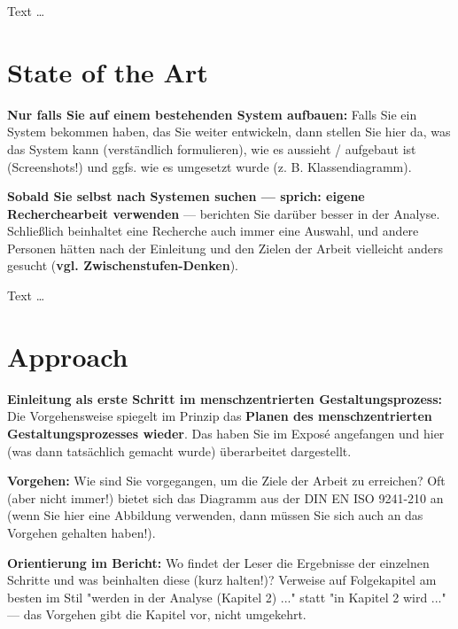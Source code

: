 \documentclass[11pt,a4paper,english]{scrreprt}
\newenvironment{comment}
  {\par\medskip
   \begingroup\color{olive}%
   }
 {\endgroup
  \medskip}
\begin{document}
Text \dots

\section{State of the Art}
\begin{comment}
\textbf{Nur falls Sie auf einem bestehenden System aufbauen:} Falls Sie ein System bekommen haben, das Sie weiter entwickeln, dann stellen Sie hier da, was das System kann (verständlich formulieren), wie es aussieht / aufgebaut ist (Screenshots!) und ggfs. wie es umgesetzt wurde (z. B. Klassendiagramm).

\textbf{Sobald Sie selbst nach Systemen suchen — sprich: eigene Recherchearbeit verwenden} — berichten Sie darüber besser in der Analyse. Schließlich beinhaltet eine Recherche auch immer eine Auswahl, und andere Personen hätten nach der Einleitung und den Zielen der Arbeit vielleicht anders gesucht (\textbf{vgl. Zwischenstufen-Denken}).
\end{comment}

Text \dots

\section{Approach}
\begin{comment}
\textbf{Einleitung als erste Schritt im menschzentrierten Gestaltungsprozess:} Die Vorgehensweise spiegelt im Prinzip das \textbf{Planen des menschzentrierten Gestaltungsprozesses wieder}. Das haben Sie im Exposé angefangen und hier (was dann tatsächlich gemacht wurde) überarbeitet dargestellt.

\textbf{Vorgehen:} Wie sind Sie vorgegangen, um die Ziele der Arbeit zu erreichen? Oft (aber nicht immer!) bietet sich das Diagramm aus der DIN EN ISO 9241-210 an (wenn Sie hier eine Abbildung verwenden, dann müssen Sie sich auch an das Vorgehen gehalten haben!).

\textbf{Orientierung im Bericht:} Wo findet der Leser die Ergebnisse der einzelnen Schritte und was beinhalten diese (kurz halten!)? Verweise auf Folgekapitel am besten im Stil "werden in der Analyse (Kapitel 2) ..." statt "in Kapitel 2 wird ..." — das Vorgehen gibt die Kapitel vor, nicht umgekehrt.
\end{comment}
\end{document}
